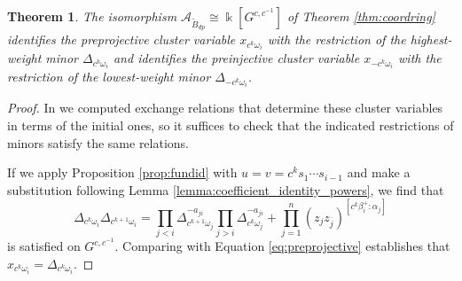 \documentclass[12pt]{amsart}
\newcommand{\cA}{\mathcal{A}}
\newcommand{\kk}{\Bbbk}%
\newcommand{\ol}[1]{\overline{#1}}
\newcommand{\Bdp}{\widetilde{B}_{dp}}
\newtheorem{theorem}{Theorem}[section]
\theoremstyle{remark}
\numberwithin{equation}{section}
\numberwithin{figure}{section}
\begin{document}
\begin{theorem}\label{thm:mainirregular}
The isomorphism $\cA_{\Bdp} \cong \kk[G^{c,c^{-1}}]$ of Theorem \ref{thm:coordring} identifies the preprojective cluster variable $x_{c^k\omega_i}$ with the restriction of the highest-weight minor $\Delta_{c^k\omega_i}$ and identifies the preinjective cluster variable $x_{-c^k \omega_i}$ with the restriction of the lowest-weight minor $\Delta_{-c^k \omega_i}$. 
\end{theorem}

\begin{proof}
In  we computed exchange relations that determine these cluster variables in terms of the initial ones, so it suffices to check that the indicated restrictions of minors satisfy the same relations.

If we apply Proposition \ref{prop:fundid} with $u = v = c^k s_1 \cdots s_{i-1}$ and make a substitution following Lemma \ref{lemma:coefficient_identity_powers}, we find that 
\begin{equation}
\Delta_{c^k\omega_i}\Delta_{c^{k+1}\omega_i} = 
    \prod_{j<i}\Delta_{c^{k+1}\omega_j}^{-a_{ji}}
    \prod_{j>i}\Delta_{c^k\omega_j}^{-a_{ji}}
    +
    \prod_{j=1}^n(z_j z_{\ol{j}})^{[c^k\beta_i^+:\alpha_j]}
\end{equation}
is satisfied on $G^{c,c^{-1}}$. 
Comparing with Equation \ref{eq:preprojective} establishes that $x_{c^k\omega_i} = \Delta_{c^k \omega_i}$.


\end{proof}
\end{document}
